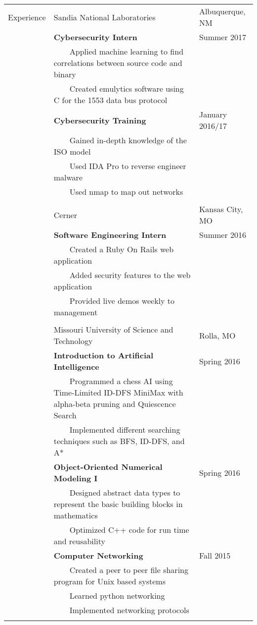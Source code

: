 \documentclass[10.5pt, arial]{article}
\newcommand{\tabitem}{~~\llap{\textbullet}~~}
\begin{document}
\begin{tabular}{p{1.5cm} p{13.2cm} l}
Experience  & Sandia National Laboratories	& Albuquerque, NM 		\\
			& \textbf{Cybersecurity Intern}										& Summer 2017 		\\
			& \tabitem Applied machine learning to find correlations between source code and binary & \\
			& \tabitem Created emulytics software using C for the 1553 data bus protocol \\
			& \textbf{Cybersecurity Training} 									& January 2016/17 			\\
			& \tabitem Gained in-depth knowledge of the ISO model 				& 						\\
			& \tabitem Used IDA Pro to reverse engineer malware 				& 						\\
			& \tabitem Used nmap to map out networks 							& 						\\ \\

			& Cerner 															& Kansas City, MO 		\\
			& \textbf{Software Engineering Intern} 								& Summer 2016			\\
			& \tabitem Created a Ruby On Rails web application 					& 						\\
			& \tabitem Added security features to the web application			& 						\\
			& \tabitem Provided live demos weekly to management 					& 						\\ \\

			& Missouri University of Science and Technology						& Rolla, MO 			\\
			& \textbf{Introduction to Artificial Intelligence} 					& Spring 2016 			\\
			& \tabitem Programmed a chess AI using Time-Limited ID-DFS MiniMax with alpha-beta pruning and Quiescence Search	& \\
			& \tabitem Implemented different searching techniques such as BFS, ID-DFS, and A* 	& 		\\

			& \textbf{Object-Oriented Numerical Modeling I} 					& Spring 2016 			\\
			& \tabitem Designed abstract data types to represent the basic building blocks in mathematics & \\
			& \tabitem Optimized C++ code for run time and reusability 		& 						\\

			& \textbf{Computer Networking} 										& Fall 2015 			\\
			& \tabitem Created a peer to peer file sharing program for Unix based systems 		& 		\\
			& \tabitem Learned python networking 								& 						\\
			& \tabitem Implemented networking protocols 						& 						\\
						\\
\end{tabular}
\end{document}
